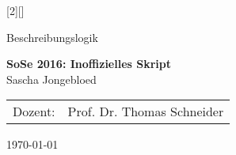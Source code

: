 [2][]{
    \thispagestyle{empty}

    \begin{minipage}[H]{\textwidth}
        \vspace{3.5cm}
        \begin{center}
                \Large Beschreibungslogik

                \vspace{1cm}
                \LARGE \textbf{SoSe 2016: Inoffizielles Skript} \\

                \vspace{3cm}
                \Large Sascha Jongebloed\\
        \end{center}
    \end{minipage}
    \vfill
    \vfill

    \begin{minipage}[H]{\textwidth}
        \begin{center}

                \begin{tabular}{ r l }
                  Dozent: & Prof. Dr. Thomas Schneider\\
                \end{tabular}
        \end{center}
    \end{minipage}
    \vspace{.5cm}

    \begin{center}
        \today
    \end{center}
    \newpage
}

\newcommand{\setpagestyle} {
    \pagestyle{fancy}
    \renewcommand{\headrulewidth}{0.1pt}
    \fancyhead[L]{\leftmark}
    \fancyfoot[C]{\thepage}
}

\newcommand{\settableofcontents} {
    \setcounter{tocdepth}{4}
    \tableofcontents
    \newpage
}

\newcommand{\setbibliography} {
    \clearpage
    \phantomsection
    \label{ch:bib}%
    \addcontentsline{toc}{section}{Literatur}%
        \nocite{*}%
}
